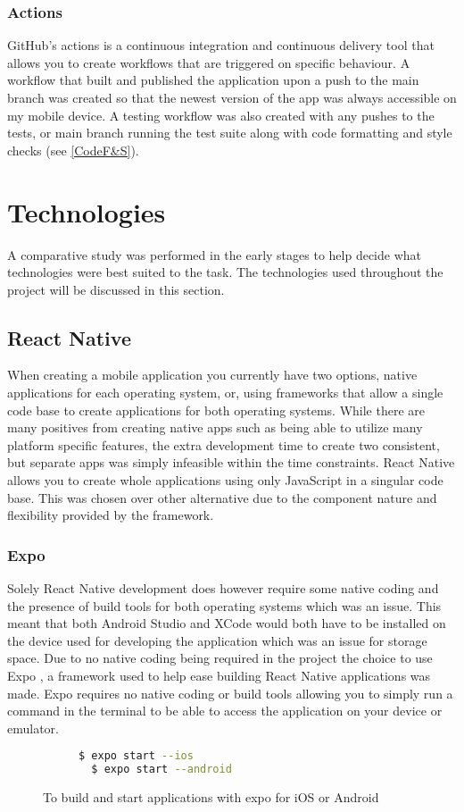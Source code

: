 \subsubsection{Actions}
GitHub's actions is a continuous integration and continuous delivery tool that allows you to create workflows that are triggered on specific behaviour. A workflow that built and published the application upon a push to the main branch was created so that the newest version of the app was always accessible on my mobile device. A testing workflow was also created with any pushes to the tests, or main branch running the test suite along with code formatting and style checks (see \ref{CodeF&S}).
\section{Technologies}
A comparative study \cite{compStudy} was performed in the early stages to help decide what technologies were best suited to the task. The technologies used throughout the project will be discussed in this section.
\subsection{React Native}
When creating a mobile application you currently have two options, native applications for each operating system, or, using frameworks that allow a single code base to create applications for both operating systems. While there are many positives from creating native apps such as being able to utilize many platform specific features, the extra development time to create two consistent, but separate apps was simply infeasible within the time constraints. React Native \cite{reactnative} allows you to create whole applications using only JavaScript \cite{js} in a singular code base. This was chosen over other alternative due to the component nature and flexibility provided by the framework. 
\subsubsection{Expo}
Solely React Native development does however require some native coding and the presence of build tools for both operating systems which was an issue. This meant that both Android Studio and XCode would both have to be installed on the device used for developing the application which was an issue for storage space. Due to no native coding being required in the project the choice to use Expo \cite{expo}, a framework used to help ease building React Native applications was made. Expo requires no native coding or build tools allowing you to simply run a command in the terminal to be able to access the application on your device or emulator.
\begin{figure}[!htbp]
\centering
\begin{subfigure}[b]{0.5\textwidth}
\begin{lstlisting}[language=bash]
  $ expo start --ios
  $ expo start --android
\end{lstlisting}
\end{subfigure}
\caption{To build and start applications with expo for iOS or Android}
\end{figure}
